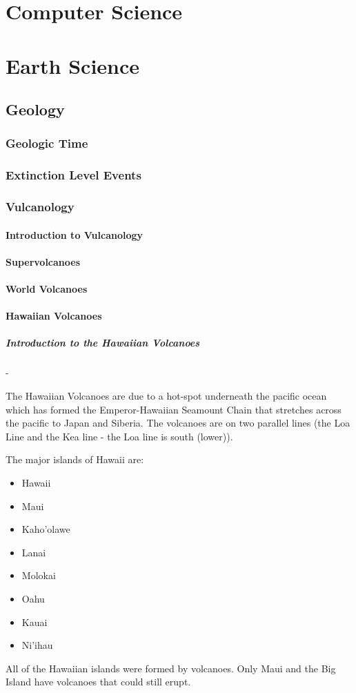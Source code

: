 \documentclass[12pt]{book}
\begin{document}
	\section{Computer Science}
	\newpage
	\section{Earth Science}
		\subsection{Geology}
			\subsubsection{Geologic Time}
			\subsubsection{Extinction Level Events}
			\subsubsection{Vulcanology}
			\paragraph{Introduction to Vulcanology}
			\paragraph{Supervolcanoes}
			\paragraph{World Volcanoes}
			\newpage
			\paragraph{Hawaiian Volcanoes}
				\subparagraph{Introduction to the Hawaiian Volcanoes} - 

					The Hawaiian Volcanoes are due to a hot-spot underneath the pacific ocean which has formed the Emperor-Hawaiian Seamount Chain that stretches across the pacific to Japan and Siberia.  The volcanoes are on two parallel lines (the Loa Line and the Kea line - the Loa line is south (lower)).   

					The major islands of Hawaii are: 
					\begin{multicols}{2}
					\begin{itemize}
						\item Hawaii
						\item Maui
						\item Kaho'olawe
						\item Lanai
						\item Molokai
						\item Oahu
						\item Kauai
						\item Ni'ihau
					\end{itemize}
					\end{multicols}
					All of the Hawaiian islands were formed by volcanoes.  Only Maui and the Big Island have volcanoes that could still erupt.  
\end{document}
